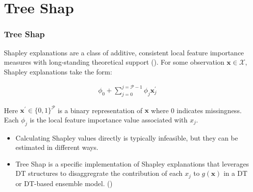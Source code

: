 \documentclass[11pt,
               aspectratio=169
               ]{beamer}
\begin{document}
	\section{Tree Shap}

		\begin{frame}[t]
		
			\frametitle{Tree Shap}
		
			Shapley explanations are a class of additive, consistent local feature importance measures with long-standing theoretical support (\cite{shapley}). For some observation $\mathbf{x} \in \mathcal{X}$, Shapley explanations take the form:
			
			\vspace{-5pt}
			
			\begin{equation*}
				\begin{aligned}
					\phi_0 + \sum_{j=0}^{j=\mathcal{P} - 1} \phi_j \mathbf{x}_j^\prime
				\end{aligned}
			\end{equation*}
			
			Here $\mathbf{x}^\prime \in \{0,1\}^\mathcal{P}$ is a binary representation of $\mathbf{x}$ where 0 indicates missingness. Each $\phi_j$ is the local feature importance value associated with $x_j$.
			
			\begin{itemize}
			
				\item Calculating Shapley values directly is typically infeasible, but they can be estimated in different ways.
			
				\item Tree Shap is a specific implementation of Shapley explanations that leverages DT structures to disaggregrate the contribution of each $x_j$ to $g(\mathbf{x})$ in a DT or DT-based ensemble model. (\cite{tree_shap})
				
			\end{itemize}
			
		\end{frame}
	
\end{document}
